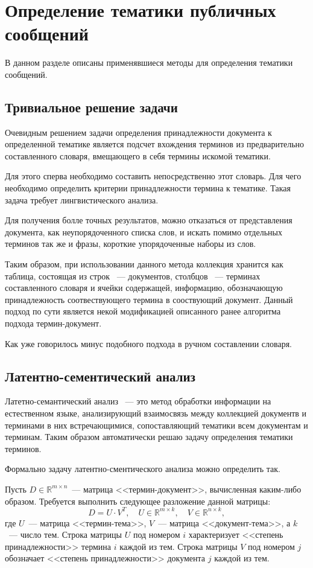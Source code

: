 \documentclass[annotation,times,page4]{itmo-student-thesis}
\begin{document}
\section{Определение тематики публичных сообщений}
В данном разделе описаны применявшиеся методы для определения тематики сообщений.
\subsection{Тривиальное решение задачи}
Очевидным решением задачи определения принадлежности документа к определенной тематике является подсчет вхождения терминов из предварительно составленного словаря, вмещающего в себя термины искомой тематики.

Для этого сперва необходимо составить непосредственно этот словарь. Для чего необходимо определить критерии принадлежности термина к тематике. Такая задача требует лингвистического анализа.

Для получения болле точных результатов, можно отказаться от представления документа, как неупорядоченного списка слов, и искать помимо отдельных терминов так же и фразы, короткие упорядоченные наборы из слов.

Таким образом, при использовании данного метода коллекция хранится как таблица, состоящая из строк ~--- документов, столбцов ~--- терминах составленного словаря и ячейки содержащей, информацию, обозначающую принадлежность соотвествующего термина в сооствующий документ. Данный подход по сути является некой модификацией описанного ранее алгоритма подхода термин-документ.

Как уже говорилось минус подобного подхода в ручном составлении словаря.
\subsection{Латентно-сементический анализ}
Латетно-семантический анализ ~--- это метод обработки информации на естественном языке, анализирующий взаимосвязь между коллекцией документв и терминами в них встречающимися, сопоставляющий тематики всем документам и терминам. Таким образом автоматически решаю задачу определения тематики терминов.

Формально задачу латентно-сментического анализа можно определить так.

Пусть $D \in \mathbb{R}^{m \times n}$~--- матрица 
<<термин-документ>>, вычисленная каким-либо образом. Требуется
выполнить следующее разложение данной матрицы:
\[
    D = U \cdot V^T,\quad U \in \mathbb{R}^{m \times k},\quad V \in \mathbb{R}^{n \times k},
\]
где $U$~--- матрица <<термин-тема>>, $V$~--- матрица <<документ-тема>>,
а $k$~--- число тем. Строка матрицы $U$ под номером $i$ 
характеризует <<степень принадлежности>> термина $i$ 
каждой из тем. Строка матрицы $V$ под номером $j$ обозначает
<<степень принадлежности>> документа $j$ каждой из тем.
\end{document}

